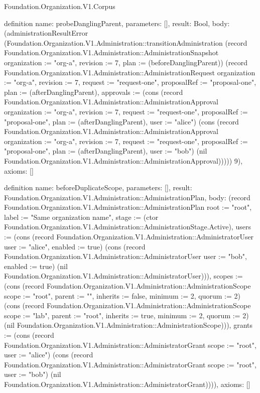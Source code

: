 \begin{lexlean}{Foundation.Organization.V1.Corpus}
\begin{semanticmodule}
definition{
  name: probeDanglingParent,
  parameters: [],
  result: Bool,
  body: (administrationResultError (Foundation.Organization.V1.Administration::transitionAdministration (record Foundation.Organization.V1.Administration::AdministrationSnapshot {organization := "org-a", revision := 7, plan := (beforeDanglingParent)}) (record Foundation.Organization.V1.Administration::AdministrationRequest {organization := "org-a", revision := 7, request := "request-one", proposalRef := "proposal-one", plan := (afterDanglingParent), approvals := (cons (record Foundation.Organization.V1.Administration::AdministrationApproval {organization := "org-a", revision := 7, request := "request-one", proposalRef := "proposal-one", plan := (afterDanglingParent), user := "alice"}) (cons (record Foundation.Organization.V1.Administration::AdministrationApproval {organization := "org-a", revision := 7, request := "request-one", proposalRef := "proposal-one", plan := (afterDanglingParent), user := "bob"}) (nil Foundation.Organization.V1.Administration::AdministrationApproval)))})) 9),
  axioms: []
}

definition{
  name: beforeDuplicateScope,
  parameters: [],
  result: Foundation.Organization.V1.Administration::AdministrationPlan,
  body: (record Foundation.Organization.V1.Administration::AdministrationPlan {root := "root", label := "Same organization name", stage := (ctor Foundation.Organization.V1.Administration::AdministrationStage.Active), users := (cons (record Foundation.Organization.V1.Administration::AdministratorUser {user := "alice", enabled := true}) (cons (record Foundation.Organization.V1.Administration::AdministratorUser {user := "bob", enabled := true}) (nil Foundation.Organization.V1.Administration::AdministratorUser))), scopes := (cons (record Foundation.Organization.V1.Administration::AdministrationScope {scope := "root", parent := "", inherits := false, minimum := 2, quorum := 2}) (cons (record Foundation.Organization.V1.Administration::AdministrationScope {scope := "lab", parent := "root", inherits := true, minimum := 2, quorum := 2}) (nil Foundation.Organization.V1.Administration::AdministrationScope))), grants := (cons (record Foundation.Organization.V1.Administration::AdministratorGrant {scope := "root", user := "alice"}) (cons (record Foundation.Organization.V1.Administration::AdministratorGrant {scope := "root", user := "bob"}) (nil Foundation.Organization.V1.Administration::AdministratorGrant)))}),
  axioms: []
}


\end{semanticmodule}
\end{lexlean}
